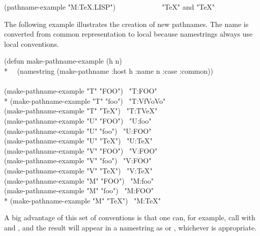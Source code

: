 \begin{newer}
\begin{lisp}
(pathname-example "M:TeX.LISP")~~~~~~~~~~~~\EV\ "TeX" \textrm{and} "TeX"
\end{lisp}
The following example illustrates the creation of new pathnames.
The name is converted from common representation to local because
namestrings always use local conventions.
\begin{lisp}
(defun make-pathname-example (h n) \\*
~~(namestring (make-pathname :host h :name n :case :common)) \\
\\
(make-pathname-example "T" "FOO") \EV\ "T:FOO" \\*
(make-pathname-example "T" "foo") \EV\ "T:{\Xcircumflex}Vf{\Xcircumflex}Vo{\Xcircumflex}Vo" \\
(make-pathname-example "T" "TeX") \EV\ "T:T{\Xcircumflex}VeX" \\
(make-pathname-example "U" "FOO") \EV\ "U:foo" \\
(make-pathname-example "U" "foo") \EV\ "U:FOO" \\
(make-pathname-example "U" "TeX") \EV\ "U:TeX" \\
(make-pathname-example "V" "FOO") \EV\ "V:FOO" \\
(make-pathname-example "V" "foo") \EV\ "V:FOO" \\
(make-pathname-example "V" "TeX") \EV\ "V:TeX" \\
(make-pathname-example "M" "FOO") \EV\ "M:foo" \\
(make-pathname-example "M" "foo") \EV\ "M:FOO" \\*
(make-pathname-example "M" "TeX") \EV\ "M:TeX"
\end{lisp}
A big advantage of this set of conventions is that one can, for example,
call  with  and ,
and the result will appear in a namestring as  or ,
whichever is appropriate.
\end{newer}

